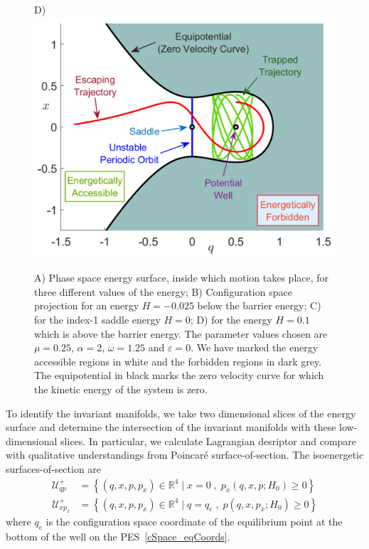 \documentclass{ws-ijbc}
\begin{document}
\begin{figure}[!ht]
\begin{center}
		D)\includegraphics[scale=0.32]{fig7d}
	\end{center}

	\caption{A) Phase space energy surface, inside which motion takes place, for three different values of the energy; B) Configuration space projection for an energy $H = -0.025$ below the barrier energy; C) for the index-1 saddle energy $H = 0$; D) for the energy $H = 0.1$ which is above the barrier energy. The parameter values chosen are $\mu = 0.25$, $\alpha = 2$, $\omega = 1.25$ and $\varepsilon = 0$. We have marked the energy accessible regions in white and the forbidden regions in dark grey. The equipotential in black marks the zero velocity curve for which the kinetic energy of the system is zero.}
	\label{EnergySurf_Hills}
\end{figure}

To identify the invariant manifolds, we take two dimensional slices of the energy surface and determine the intersection of the invariant manifolds with these low-dimensional slices. In particular, we calculate Lagrangian desriptor and compare with qualitative understandings from Poincar\'e surface-of-section. The isoenergetic surfaces-of-section are
\begin{align}
\mathcal{U}_{qp}^{+} &= \left\lbrace (q,x,p,p_x) \in \mathbb{R}^4 \; \big| \; x = 0 \; ,\; p_x(q,x,p;H_0) \geq 0 \right\rbrace \label{sos_qp}\\ 
\mathcal{U}_{xp_x}^{+} &= \left\lbrace (q,x,p,p_x) \in \mathbb{R}^4 \; \big| \; q = q_e \; , \; p(q,x,p_x;H_0) \geq 0 \right\rbrace \label{sos_xpx}
\end{align}
where $q_e$ is the configuration space coordinate of the equilibrium point at the bottom of the well on the PES~\eqref{cSpace_eqCoords}.
\end{document}
